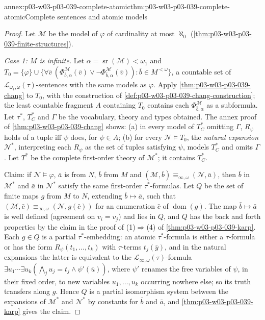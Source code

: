\begin{annexitem}{annex:p03-w03-p03-039-complete-atomic}{thm:p03-w03-p03-039-complete-atomic}{Complete sentences and atomic models}
\begin{proof}
Let \(\mathcal M\) be the model of \(\varphi\) of cardinality at most
\(\aleph_0\) (\cref{thm:p03-w03-p03-039-finite-structures}).

\emph{Case 1: \(M\) is infinite.} Let \(\alpha=\operatorname{sr}(\mathcal M)<\omega_1\)
and \(T_0=\{\varphi\}\cup\{\forall\bar v\,(\Phi^{\mathcal M}_{\bar b,\alpha}(\bar v)\vee\neg\Phi^{\mathcal M}_{\bar b,\alpha}(\bar v)):\bar b\in M^{<\omega}\}\),
a countable set of \(\mathcal L_{\omega_1,\omega}(\tau)\)-sentences with the
same models as \(\varphi\). Apply \cref{thm:p03-w03-p03-039-chang} to
\(T_0\), with the construction of
\cref{def:p03-w03-p03-039-chang-construction}; the least countable fragment
\(A\) containing \(T_0\) contains each \(\Phi^{\mathcal M}_{\bar b,\alpha}\)
as a subformula. Let \(\tau^*\), \(T^*_C\) and \(\Gamma\) be the vocabulary,
theory and types obtained. The annex proof of
\cref{thm:p03-w03-p03-039-chang} shows: (a) in every model of \(T^*_C\)
omitting \(\Gamma\), \(R_\psi\) holds of a tuple iff \(\psi\) does, for
\(\psi\in A\); (b) for every \(\mathcal N\models T_0\), the \emph{natural
expansion} \(\mathcal N^*\), interpreting each \(R_\psi\) as the set of
tuples satisfying \(\psi\), models \(T^*_C\) and omits \(\Gamma\). Let
\(T^*\) be the complete first-order theory of \(\mathcal M^*\); it contains
\(T^*_C\).

Claim: if \(\mathcal N\models\varphi\), \(\bar a\) is from \(N\), \(\bar b\)
from \(M\) and \((\mathcal M,\bar b)\equiv_{\infty,\omega}(\mathcal N,\bar a)\),
then \(\bar b\) in \(\mathcal M^*\) and \(\bar a\) in \(\mathcal N^*\) satisfy
the same first-order \(\tau^*\)-formulas. Let \(Q\) be the set of finite
maps \(g\) from \(M\) to \(N\), extending \(\bar b\mapsto\bar a\), such that
\((\mathcal M,\bar c)\equiv_{\infty,\omega}(\mathcal N,g(\bar c))\) for an
enumeration \(\bar c\) of \(\operatorname{dom}(g)\). The map
\(\bar b\mapsto\bar a\) is well defined (agreement on \(v_i=v_j\)) and lies in
\(Q\), and \(Q\) has the back and forth properties by the claim in the proof
of (1)\(\Rightarrow\)(4) of \cref{thm:p03-w03-p03-039-karp}. Each \(g\in Q\)
is a partial \(\tau^*\)-embedding: an atomic \(\tau^*\)-formula is either a
\(\tau\)-formula or has the form \(R_\psi(t_1,\ldots,t_k)\) with
\(\tau\)-terms \(t_j(\bar y)\), and in the natural expansions the latter is
equivalent to the \(\mathcal L_{\infty,\omega}(\tau)\)-formula
\(\exists u_1\cdots\exists u_k(\bigwedge_ju_j=t_j\wedge\psi'(\bar u))\),
where \(\psi'\) renames the free variables of \(\psi\), in their fixed order,
to new variables \(u_1,\ldots,u_k\) occurring nowhere else; so its truth
transfers along \(g\). Hence \(Q\) is a partial isomorphism system between the expansions of
\(\mathcal M^*\) and \(\mathcal N^*\) by constants for \(\bar b\) and \(\bar a\),
and \cref{thm:p03-w03-p03-039-karp} gives the claim.


\end{proof}
\end{annexitem}
